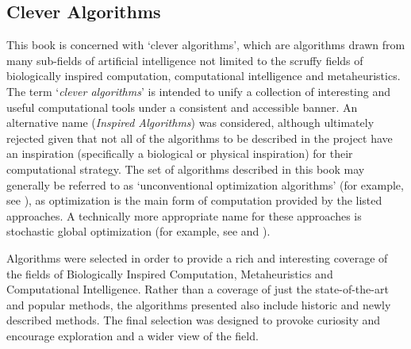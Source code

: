 \begin{bibunit}
% 
% 
\subsection{Clever Algorithms}
\label{sec:clever_algorithms}
This book is concerned with `clever algorithms', which are algorithms drawn from many sub-fields of artificial intelligence not limited to the scruffy fields of biologically inspired computation, computational intelligence and metaheuristics. 
The term `\emph{clever algorithms}' is intended to unify a collection of interesting and useful computational tools under a consistent and accessible banner. An alternative name (\emph{Inspired Algorithms}) was considered, although ultimately rejected given that not all of the algorithms to be described in the project have an inspiration (specifically a biological or physical inspiration) for their computational strategy. 
The set of algorithms described in this book may generally be referred to as `unconventional optimization algorithms' (for example, see \cite{Corne1999}), as optimization is the main form of computation provided by the listed approaches. A technically more appropriate name for these approaches is stochastic global optimization (for example, see \cite{Weise2007} and \cite{Luke2009}).

Algorithms were selected in order to provide a rich and interesting coverage of the fields of Biologically Inspired Computation, Metaheuristics and Computational Intelligence. Rather than a coverage of just the state-of-the-art and popular methods, the algorithms presented also include historic and newly described methods. The final selection was designed to provoke curiosity and encourage exploration and a wider view of the field.

% 
% 

\end{bibunit}
